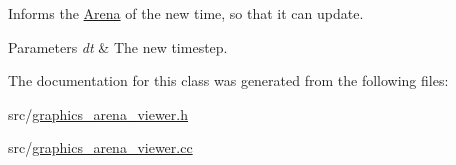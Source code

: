 Informs the \mbox{\hyperlink{class_arena}{Arena}} of the new time, so that it can update. 


\begin{DoxyParams}{Parameters}
{\em dt} & The new timestep. \\
\hline
\end{DoxyParams}


The documentation for this class was generated from the following files\+:\begin{DoxyCompactItemize}
\item 
src/\mbox{\hyperlink{graphics__arena__viewer_8h}{graphics\+\_\+arena\+\_\+viewer.\+h}}\item 
src/\mbox{\hyperlink{graphics__arena__viewer_8cc}{graphics\+\_\+arena\+\_\+viewer.\+cc}}\end{DoxyCompactItemize}
